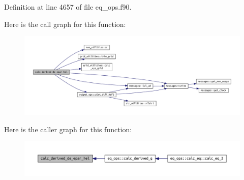 Definition at line 4657 of file eq\+\_\+ops.\+f90.

Here is the call graph for this function\+:
\nopagebreak
\begin{figure}[H]
\begin{center}
\leavevmode
\includegraphics[width=350pt]{eq__ops_8f90_a369b73b541213d572d7197e0d549c014_cgraph}
\end{center}
\end{figure}
Here is the caller graph for this function\+:
\nopagebreak
\begin{figure}[H]
\begin{center}
\leavevmode
\includegraphics[width=350pt]{eq__ops_8f90_a369b73b541213d572d7197e0d549c014_icgraph}
\end{center}
\end{figure}
